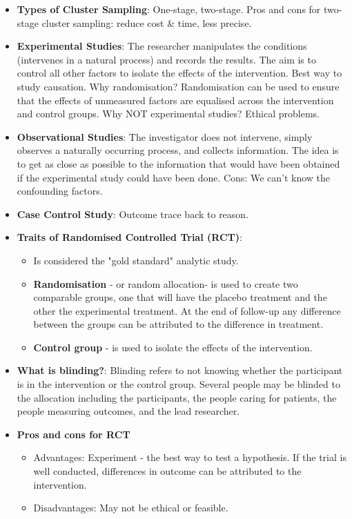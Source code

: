 \documentclass[12pt]{book}
\begin{document}
\begin{itemize}
\item \textbf{Types of Cluster Sampling}: One-stage, two-stage. Pros and cons for two-stage cluster sampling: reduce cost \& time, less precise.
\item \textbf{Experimental Studies}: The researcher manipulates the conditions (intervenes in a natural process) and records the results. The aim is to control all other factors to isolate the effects of the intervention. Best way to study causation. Why randomisation? Randomisation can be used to ensure that the effects of unmeasured factors are equalised across the intervention and control groups. Why NOT experimental studies? Ethical problems.
\item \textbf{Observational Studies}: The investigator does not intervene, simply observes a naturally occurring process, and collects information. The idea is to get as close as possible to the information that would have been obtained if the experimental study could have been done. Cons: We can't know the confounding factors.
\item \textbf{Case Control Study}: Outcome trace back to reason.
\item \textbf{Traits of Randomised Controlled Trial (RCT)}: 
	\begin{itemize}
	\item Is considered the "gold standard" analytic study.
	\item \textbf{Randomisation} - or random allocation- is used to create two comparable groups, one that will have the placebo treatment and the other the experimental treatment. At the end of follow-up any difference between the groups can be attributed to the difference in treatment.
	\item \textbf{Control group} - is used to isolate the effects of the intervention.
	\end{itemize}
\item \textbf{What is blinding?}: Blinding refers to not knowing whether the participant is in the intervention or the control group. Several people may be blinded to the allocation including the participants, the people caring for patients, the people measuring outcomes, and the lead researcher.
\item \textbf{Pros and cons for RCT}
    \begin{itemize}
    \item Advantages: Experiment - the best way to test a hypothesis. If the trial is well conducted, differences in outcome can be attributed to the intervention.
    \item Disadvantages: May not be ethical or feasible.

\end{itemize}
\end{itemize}
\end{document}

